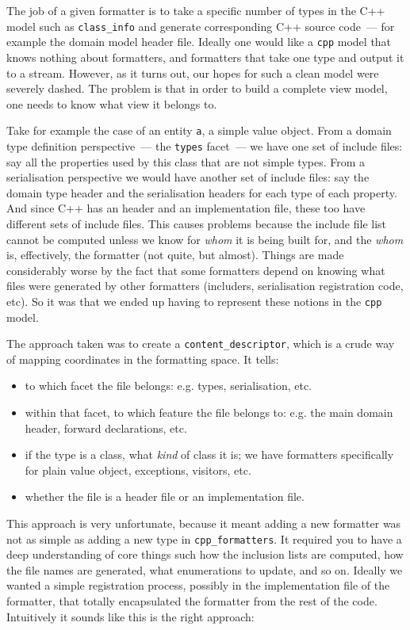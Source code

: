 \documentclass{book}
\begin{document}
The job of a given formatter is to take a specific number of types in
the C++ model such as \texttt{class\_info} and generate corresponding
C++ source code~--- for example the domain model header file. Ideally
one would like a \texttt{cpp} model that knows nothing about
formatters, and formatters that take one type and output it to a
stream. However, as it turns out, our hopes for such a clean model
were severely dashed. The problem is that in order to build a complete
view model, one needs to know what view it belongs to.

Take for example the case of an entity \texttt{a}, a simple value
object. From a domain type definition perspective~--- the
\texttt{types} facet~--- we have one set of include files: say all the
properties used by this class that are not simple types. From a
serialisation perspective we would have another set of include files:
say the domain type header and the serialisation headers for each type
of each property. And since C++ has an header and an implementation
file, these too have different sets of include files. This causes
problems because the include file list cannot be computed unless we
know for \emph{whom} it is being built for, and the \emph{whom} is,
effectively, the formatter (not quite, but almost). Things are made
considerably worse by the fact that some formatters depend on knowing
what files were generated by other formatters (includers,
serialisation registration code, etc). So it was that we ended up
having to represent these notions in the \texttt{cpp} model.

The approach taken was to create a \texttt{content\_descriptor}, which
is a crude way of mapping coordinates in the formatting space. It
tells:

\begin{itemize}
\item to which facet the file belongs: e.g. types, serialisation, etc.
\item within that facet, to which feature the file belongs to:
  e.g. the main domain header, forward declarations, etc.
\item if the type is a class, what \emph{kind} of class it is; we have
  formatters specifically for plain value object, exceptions,
  visitors, etc.
\item whether the file is a header file or an implementation file.
\end{itemize}

This approach is very unfortunate, because it meant adding a new
formatter was not as simple as adding a new type in
\texttt{cpp\_formatters}. It required you to have a deep understanding
of core things such how the inclusion lists are computed, how the file
names are generated, what enumerations to update, and so on. Ideally
we wanted a simple registration process, possibly in the
implementation file of the formatter, that totally encapsulated the
formatter from the rest of the code. Intuitively it sounds like this
is the right approach:
\end{document}
